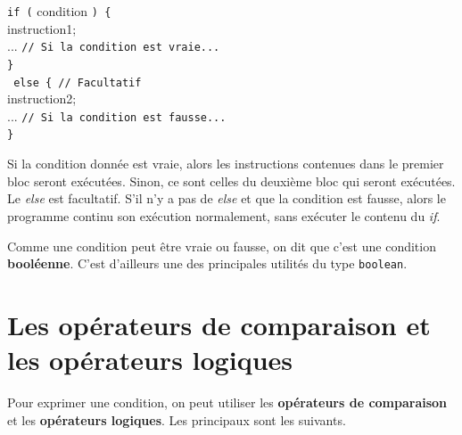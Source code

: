\documentclass[12pt]{report}
\begin{document}
\begin{tcolorbox}[enhanced,colframe=ultRed,
	title={La structure \emph{if else}},
	sharp corners=south,
	boxsep = 1.5mm]
\texttt{{\color{ultRed}if} (} {\color[RGB]{255, 34, 12} condition} \texttt{) \{}\\
	\hspace*{0.5cm} {\color[RGB]{63, 136, 197} instruction1};\\	
	\hspace*{0.5cm} ... \texttt{// Si la condition est vraie...}\\
\texttt{\}\\
{\color{ultRed} else} \{ // Facultatif \\}
	\hspace*{0.5cm} {\color[RGB]{63, 136, 197} instruction2};\\ 
	\hspace*{0.5cm} ... \texttt{// Si la condition est fausse...} \\
\texttt{\}}
%
\end{tcolorbox}

Si la condition donnée est vraie, alors les instructions contenues dans le premier bloc seront exécutées. Sinon, ce sont celles du deuxième bloc qui seront exécutées. Le \emph{else} est facultatif. S'il n'y a pas de \emph{else} et que la condition est fausse, alors le programme continu son exécution normalement, sans exécuter le contenu du \emph{if}.

Comme une condition peut être vraie ou fausse, on dit que c'est une condition \textbf{booléenne}. C'est d'ailleurs une des principales utilités du type \texttt{boolean}.



\section{Les opérateurs de comparaison et les opérateurs logiques}

Pour exprimer une condition, on peut utiliser les \textbf{opérateurs de comparaison} et les \textbf{opérateurs logiques}. Les principaux sont les suivants.
\end{document}
